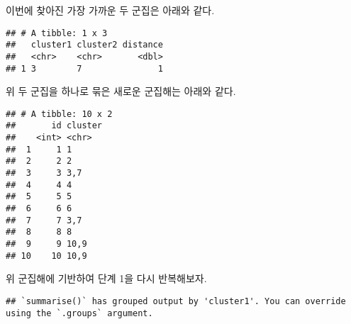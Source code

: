 \documentclass[
]{book}
\newenvironment{Shaded}{\begin{snugshade}}{\end{snugshade}}
\newcommand{\DecValTok}[1]{\textcolor[rgb]{0.00,0.00,0.81}{#1}}
\newcommand{\FunctionTok}[1]{\textcolor[rgb]{0.00,0.00,0.00}{#1}}
\newcommand{\NormalTok}[1]{#1}
\newcommand{\OtherTok}[1]{\textcolor[rgb]{0.56,0.35,0.01}{#1}}
\newcommand{\SpecialCharTok}[1]{\textcolor[rgb]{0.00,0.00,0.00}{#1}}
\begin{document}
이번에 찾아진 가장 가까운 두 군집은 아래와 같다.

\begin{Shaded}
\end{Shaded}

\begin{verbatim}
## # A tibble: 1 x 3
##   cluster1 cluster2 distance
##   <chr>    <chr>       <dbl>
## 1 3        7               1
\end{verbatim}

위 두 군집을 하나로 묶은 새로운 군집해는 아래와 같다.

\begin{Shaded}
\end{Shaded}

\begin{verbatim}
## # A tibble: 10 x 2
##       id cluster
##    <int> <chr>  
##  1     1 1      
##  2     2 2      
##  3     3 3,7    
##  4     4 4      
##  5     5 5      
##  6     6 6      
##  7     7 3,7    
##  8     8 8      
##  9     9 10,9   
## 10    10 10,9
\end{verbatim}

위 군집해에 기반하여 단계 1을 다시 반복해보자.

\begin{Shaded}
\end{Shaded}

\begin{verbatim}
## `summarise()` has grouped output by 'cluster1'. You can override using the `.groups` argument.
\end{verbatim}

\begin{Shaded}
\end{Shaded}
\end{document}
